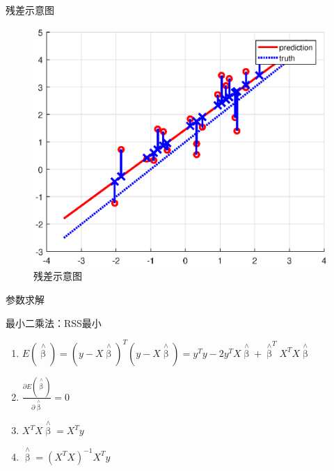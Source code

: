 \documentclass[xetex,mathserif,serif]{beamer}
\begin{document}
\begin{frame}{残差示意图}
\begin{figure}
  \centering
  \includegraphics[width=\textwidth]{residuals.eps}
  \caption{残差示意图}\label{2}
\end{figure}

\end{frame}

\begin{frame}{参数求解}
\begin{block}{最小二乘法：RSS最小}
\begin{enumerate}
  \item $E(\mathop \beta \limits^ \wedge) = {\left( {y  - X\mathop \beta \limits^ \wedge  } \right)^T}\left( {y  - X\mathop \beta \limits^ \wedge  } \right) = y^T y - 2 y^T X \mathop \beta \limits^ \wedge + {\mathop \beta \limits^ \wedge} ^T X ^T X \mathop \beta \limits^ \wedge$
  \item $\frac{{\partial E\left( {\mathop \beta \limits^ \wedge  } \right)}}{{\partial \mathop \beta \limits^ \wedge  }} = 0$
  \item $ X^T X \mathop \beta \limits^ \wedge  = X^T y $
  \item $ \mathop \beta \limits^ \wedge = {\left( {{X^T}X} \right)^{ - 1}}{X^T}y $
\end{enumerate}
\end{block}
\end{frame}
\end{document}
